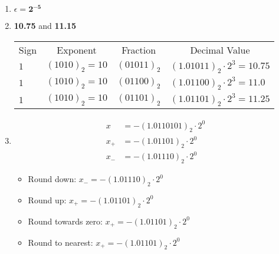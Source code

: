 \documentclass{article}
\begin{document}
\begin{enumerate}
\begin{enumerate}
	\item $\epsilon = \boldsymbol{2^{-5}}$
	\item \textbf{10.75} and \textbf{11.15}
	
\begin{tabular}{ |l|l|l|l| }
   \multicolumn{1}{c}{Sign}
 & \multicolumn{1}{c}{Exponent}
 & \multicolumn{1}{c}{Fraction}
 & \multicolumn{1}{c}{Decimal Value} \\
\cline{1-4}
$1$ & $(1010)_2=10$ & $(01011)_2$ & $(1.01011)_2 \cdot 2^3=10.75$
 \\
\cline{1-4}
$1$ & $(1010)_2=10$ & $(01100)_2$ & $(1.01100)_2 \cdot 2^3=11.0$
 \\
\cline{1-4}
$1$ & $(1010)_2=10$ & $(01101)_2$ & $(1.01101)_2 \cdot 2^3=11.25$
 \\
\cline{1-4}
\end{tabular}
	\item \begin{align*} 
	x   &=-(1.0110101)_2 \cdot 2^0 \\
	x_+ &= -(1.01101)_2 \cdot 2^0 \\
	x_- &= -(1.01110)_2 \cdot 2^0
	\end{align*}
	\begin{itemize}
	  \item Round down: $x_- = -(1.01110)_2 \cdot 2^0$
	  \item Round up: $x_+ = -(1.01101)_2 \cdot 2^0$
	  \item Round towards zero: $x_+ = -(1.01101)_2 \cdot 2^0$
	  \item Round to nearest: $x_+ = -(1.01101)_2 \cdot 2^0$
	\end{itemize}

   \end{enumerate}


\end{enumerate}
\end{document}
